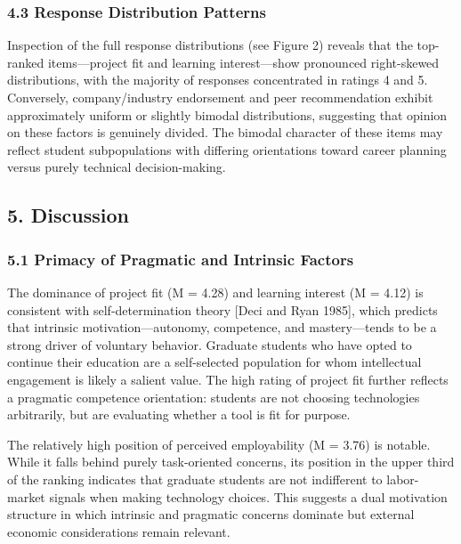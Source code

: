 \documentclass[
]{article}
\begin{document}
\subsubsection{4.3 Response Distribution
Patterns}\label{response-distribution-patterns}

Inspection of the full response distributions (see Figure 2) reveals
that the top-ranked items---project fit and learning interest---show
pronounced right-skewed distributions, with the majority of responses
concentrated in ratings 4 and 5. Conversely, company/industry
endorsement and peer recommendation exhibit approximately uniform or
slightly bimodal distributions, suggesting that opinion on these factors
is genuinely divided. The bimodal character of these items may reflect
student subpopulations with differing orientations toward career
planning versus purely technical decision-making.

\subsection{5. Discussion}\label{discussion}

\subsubsection{5.1 Primacy of Pragmatic and Intrinsic
Factors}\label{primacy-of-pragmatic-and-intrinsic-factors}

The dominance of project fit (M = 4.28) and learning interest (M = 4.12)
is consistent with self-determination theory {[}Deci and Ryan 1985{]},
which predicts that intrinsic motivation---autonomy, competence, and
mastery---tends to be a strong driver of voluntary behavior. Graduate
students who have opted to continue their education are a self-selected
population for whom intellectual engagement is likely a salient value.
The high rating of project fit further reflects a pragmatic competence
orientation: students are not choosing technologies arbitrarily, but are
evaluating whether a tool is fit for purpose.

The relatively high position of perceived employability (M = 3.76) is
notable. While it falls behind purely task-oriented concerns, its
position in the upper third of the ranking indicates that graduate
students are not indifferent to labor-market signals when making
technology choices. This suggests a dual motivation structure in which
intrinsic and pragmatic concerns dominate but external economic
considerations remain relevant.
\end{document}
